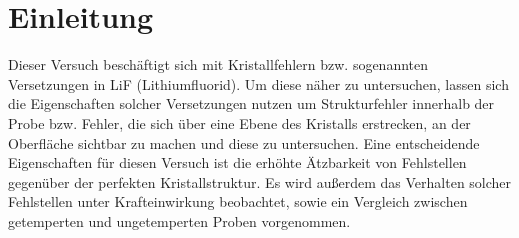 ﻿\section{Einleitung}
Dieser Versuch beschäftigt sich mit Kristallfehlern bzw. sogenannten Versetzungen in LiF (Lithiumfluorid). Um diese
näher zu untersuchen, lassen sich die Eigenschaften solcher Versetzungen nutzen um Strukturfehler innerhalb der Probe
bzw. Fehler, die sich über eine Ebene des Kristalls erstrecken, an der Oberfläche sichtbar zu machen und diese zu untersuchen.
Eine entscheidende Eigenschaften für diesen Versuch ist die erhöhte Ätzbarkeit von Fehlstellen gegenüber der perfekten Kristallstruktur.
Es wird außerdem das Verhalten solcher Fehlstellen unter Krafteinwirkung beobachtet, sowie ein Vergleich zwischen getemperten und ungetemperten Proben vorgenommen.
